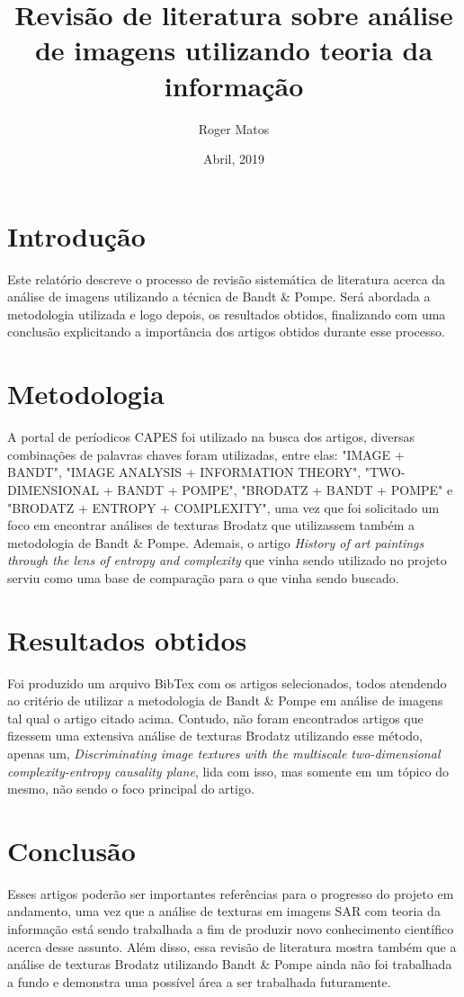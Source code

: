 \documentclass[12pt]{article}
\title{Revisão de literatura sobre análise de imagens utilizando teoria da informação}
\author{Roger Matos\inst{1}}
\date{Abril, 2019}
\begin{document}
\maketitle

\section{Introdução}

Este relatório descreve o processo de revisão sistemática de literatura acerca da análise de imagens utilizando a técnica de Bandt \& Pompe. Será abordada a metodologia utilizada e logo depois, os resultados obtidos, finalizando com uma conclusão explicitando a importância dos artigos obtidos durante esse processo.

\section{Metodologia}

A portal de períodicos CAPES foi utilizado na busca dos artigos, diversas combinações de palavras chaves foram utilizadas, entre elas: "IMAGE + BANDT", "IMAGE ANALYSIS + INFORMATION THEORY", "TWO-DIMENSIONAL + BANDT + POMPE", "BRODATZ + BANDT + POMPE" e "BRODATZ + ENTROPY + COMPLEXITY", uma vez que foi solicitado um foco em encontrar análises de texturas Brodatz que utilizassem também a metodologia de Bandt \& Pompe. Ademais, o artigo \textit{History of art paintings through the lens of entropy and complexity} que vinha sendo utilizado no projeto serviu como uma base de comparação para o que vinha sendo buscado.

\section{Resultados obtidos}

Foi produzido um arquivo BibTex com os artigos selecionados, todos atendendo ao critério de utilizar a metodologia de Bandt \& Pompe em análise de imagens tal qual o artigo citado acima. Contudo, não foram encontrados artigos que fizessem uma extensiva análise de texturas Brodatz utilizando esse método, apenas um, \textit{Discriminating image textures with the multiscale two-dimensional complexity-entropy causality plane}, lida com isso, mas somente em um tópico do mesmo, não sendo o foco principal do artigo. 

\section{Conclusão}

Esses artigos poderão ser importantes referências para o progresso do projeto em andamento, uma vez que a análise de texturas em imagens SAR com teoria da informação está sendo trabalhada a fim de produzir novo conhecimento científico acerca desse assunto. Além disso, essa revisão de literatura mostra também que a análise de texturas Brodatz utilizando Bandt \& Pompe ainda não foi trabalhada a fundo e demonstra uma possível área a ser trabalhada futuramente.
\end{document}
